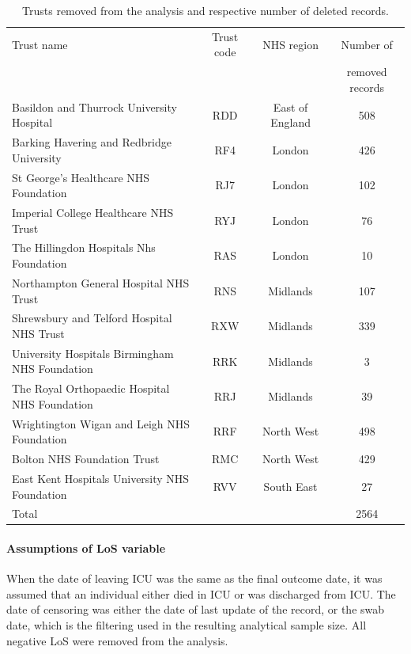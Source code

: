 \documentclass[review]{elsarticle}
\begin{document}
\begin{table}
\centering
\small
\caption{Trusts removed from the analysis and respective number of deleted records.}
\label{Tab:Trusts_removed}
\singlespacing
\begin{tabularx}{\textwidth}{>{\arraybackslash}m{3.5cm}ccc} 
\toprule
Trust name	&	Trust code	&	NHS region	&	Number of 	\\
	&	 	&		&	removed records\\ [2ex] \midrule
Basildon and Thurrock University Hospital	&	RDD	&	East of England	&	508	\\
Barking Havering and Redbridge University	&	RF4	&	London	&	426	\\
St George's Healthcare NHS Foundation	&	RJ7	&	London	&	102	\\
Imperial College Healthcare NHS Trust	&	RYJ	&	London	&	76	\\
The Hillingdon Hospitals Nhs Foundation	&	RAS	&	London	&	10	\\
Northampton General Hospital NHS Trust	&	RNS	&	Midlands	&	107	\\
Shrewsbury and Telford Hospital NHS Trust	&	RXW	&	Midlands	&	339	\\
University Hospitals Birmingham NHS Foundation	&	RRK	&	Midlands	&	3	\\
The Royal Orthopaedic Hospital NHS Foundation	&	RRJ	&	Midlands	&	39	\\
Wrightington Wigan and Leigh NHS Foundation	&	RRF	&	North West	&	498	\\
Bolton NHS Foundation Trust	&	RMC	&	North West	&	429	\\
East Kent Hospitals University NHS Foundation	&	RVV	&	South East	&	27	\\
\bottomrule
Total	&		&		&	2564	\\ 
\bottomrule
\end{tabularx}
\end{table}%

\paragraph{Assumptions of LoS variable}

When the date of leaving ICU was the same as the final outcome date, it was assumed that an individual either died in ICU or was discharged from ICU. The date of censoring was either the date of last update of the record, or the swab date, which is the filtering used in the resulting analytical sample size. All negative LoS were removed from the analysis.
\end{document}
